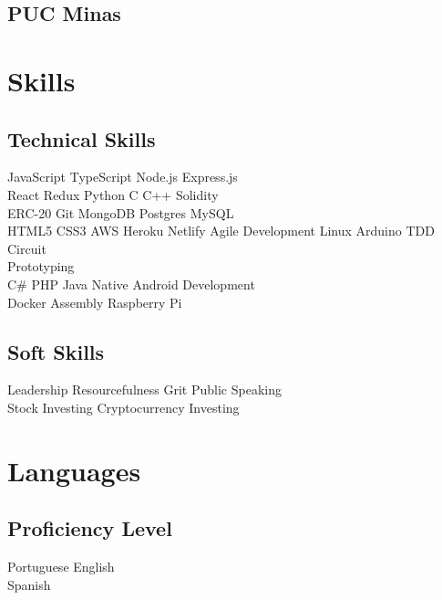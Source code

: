 \documentclass[]{deedy-resume-openfont}
\begin{document}
\begin{minipage}[t]{0.49\textwidth}
\subsection{PUC Minas}
\sectionsep


\section{Skills}
\subsection{Technical Skills}
JavaScript \textbullet{} TypeScript \textbullet{} Node.js \textbullet{} Express.js \\
React \textbullet{} Redux \textbullet{} Python \textbullet{} C \textbullet{} C++ \textbullet{} Solidity \\ ERC-20 \textbullet{} Git \textbullet{} MongoDB \textbullet{} Postgres \textbullet{} MySQL \\ HTML5 \textbullet{} CSS3 \textbullet{} AWS \textbullet{} Heroku \textbullet{} Netlify \textbullet{} Agile Development \textbullet{} Linux \textbullet{} Arduino \textbullet{} TDD \textbullet{} Circuit\\Prototyping \\
C\# \textbullet{} PHP \textbullet{} Java \textbullet{} Native Android Development \\ Docker \textbullet{} Assembly \textbullet{} Raspberry Pi
\sectionsep

\subsection{Soft Skills}
Leadership \textbullet{} Resourcefulness \textbullet{} Grit \textbullet{} Public Speaking \\
Stock Investing \textbullet{} Cryptocurrency Investing
\sectionsep

\section{Languages}
\subsection{Proficiency Level}
Portuguese \textbullet{} English \\
Spanish

%
%

\end{minipage} 
\end{document}
